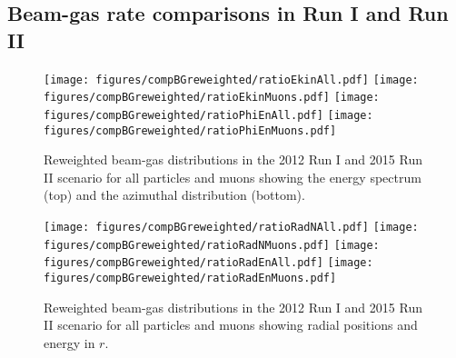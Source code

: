 \subsection{Beam-gas rate comparisons in Run I and Run II}
\begin{figure}[!htb]
\centering
\texttt{[image: figures/compBGreweighted/ratioEkinAll.pdf]}
\texttt{[image: figures/compBGreweighted/ratioEkinMuons.pdf]}
\texttt{[image: figures/compBGreweighted/ratioPhiEnAll.pdf]}
\texttt{[image: figures/compBGreweighted/ratioPhiEnMuons.pdf]}
\caption{Reweighted beam-gas distributions in the 2012 Run I and 2015 Run II scenario for all particles and muons showing the energy spectrum (top) and the azimuthal distribution (bottom).
  \label{fig:compBGreweighted1}}
\end{figure}

\begin{figure}%
\centering
\texttt{[image: figures/compBGreweighted/ratioRadNAll.pdf]}
\texttt{[image: figures/compBGreweighted/ratioRadNMuons.pdf]}
\texttt{[image: figures/compBGreweighted/ratioRadEnAll.pdf]}
\texttt{[image: figures/compBGreweighted/ratioRadEnMuons.pdf]}
\caption{Reweighted beam-gas distributions in the 2012 Run I and 2015 Run II scenario for all particles and muons showing radial positions and energy in $r$.
  \label{fig:compBGreweighted2}}
\end{figure}






